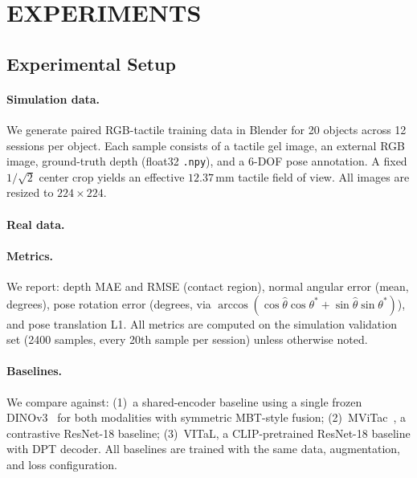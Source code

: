 \section{EXPERIMENTS}

\subsection{Experimental Setup}
\label{sec:setup}

\paragraph{Simulation data.}
We generate paired RGB-tactile training data in Blender for 20 objects across
12 sessions per object. Each sample consists of a tactile gel image, an
external RGB image, ground-truth depth (float32 \texttt{.npy}), and a
6-DOF pose annotation. A fixed $1/\sqrt{2}$ center crop yields an effective
$12.37$\,mm tactile field of view. All images are resized to
$224{\times}224$.

\paragraph{Real data.}

\paragraph{Metrics.}
We report: depth MAE and RMSE (contact region), normal angular error
(mean, degrees), pose rotation error (degrees, via
$\arccos(\cos\hat\theta\cos\theta^* + \sin\hat\theta\sin\theta^*)$),
and pose translation L1. All metrics are computed on the simulation
validation set (2400 samples, every 20th sample per session) unless
otherwise noted.

\paragraph{Baselines.}
We compare against: (1)~a shared-encoder baseline using a single frozen
DINOv3~\cite{simeoni2025dinov3} for both modalities with symmetric MBT-style
fusion; (2)~MViTac~\cite{fu2024mvitac}, a contrastive ResNet-18 baseline;
(3)~VITaL, a CLIP-pretrained ResNet-18 baseline with DPT decoder.
All baselines are trained with the same data, augmentation, and loss
configuration.

